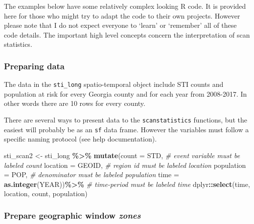 \documentclass[
]{book}
\newenvironment{Shaded}{\begin{snugshade}}{\end{snugshade}}
\newcommand{\AttributeTok}[1]{\textcolor[rgb]{0.13,0.29,0.53}{#1}}
\newcommand{\CommentTok}[1]{\textcolor[rgb]{0.56,0.35,0.01}{\textit{#1}}}
\newcommand{\FunctionTok}[1]{\textcolor[rgb]{0.13,0.29,0.53}{\textbf{#1}}}
\newcommand{\NormalTok}[1]{#1}
\newcommand{\OtherTok}[1]{\textcolor[rgb]{0.56,0.35,0.01}{#1}}
\newcommand{\SpecialCharTok}[1]{\textcolor[rgb]{0.81,0.36,0.00}{\textbf{#1}}}
\newenvironment{rmdcaution}[1]
  {
  \begin{itemize}
  \renewcommand{\labelitemi}{
    \raisebox{-.7\height}[0pt][0pt]{
      {\setkeys{Gin}{width=3em,keepaspectratio}\texttt{[image: images/\#1]}}
    }
  }
  \setlength{\fboxsep}{1em}
  \begin{caution}
  \item
  }
  {
  \end{caution}
  \end{itemize}
  }
\begin{document}
\begin{rmdcaution}{caution}
The examples below have some relatively complex looking R code. It is provided here for those who might try to adapt the code to their own projects. However please note that I do not expect everyone to `learn' or `remember' all of these code details. The important high level concepts concern the interpretation of scan statistics.

\end{rmdcaution}

\hypertarget{preparing-data}{%
\subsubsection{Preparing data}\label{preparing-data}}

The data in the \texttt{sti\_long} spatio-temporal object include STI counts and population at risk for every Georgia county and for each year from 2008-2017. In other words there are 10 rows for every county.

There are several ways to present data to the \texttt{scanstatistics} functions, but the easiest will probably be as an \texttt{sf} data frame. However the variables must follow a specific naming protocol (see help documentation).

\begin{Shaded}
\begin{Highlighting}[]
\NormalTok{sti\_scan2 }\OtherTok{\textless{}{-}}\NormalTok{ sti\_long }\SpecialCharTok{\%\textgreater{}\%}
  \FunctionTok{mutate}\NormalTok{(}\AttributeTok{count =}\NormalTok{ STD,       }\CommentTok{\# event variable must be labeled \textquotesingle{}count\textquotesingle{}}
         \AttributeTok{location =}\NormalTok{ GEOID, }\CommentTok{\# region id must be labeled \textquotesingle{}location\textquotesingle{}}
         \AttributeTok{population =}\NormalTok{ POP, }\CommentTok{\# denominator must be labeled \textquotesingle{}population}
         \AttributeTok{time =} \FunctionTok{as.integer}\NormalTok{(YEAR))}\SpecialCharTok{\%\textgreater{}\%}  \CommentTok{\# time{-}period must be labeled \textquotesingle{}time\textquotesingle{}}
\NormalTok{  dplyr}\SpecialCharTok{::}\FunctionTok{select}\NormalTok{(time, location, count, population) }
\end{Highlighting}
\end{Shaded}

\hypertarget{prepare-geographic-window-zones}{%
\subsubsection{\texorpdfstring{Prepare geographic window \emph{zones}}{Prepare geographic window zones}}\label{prepare-geographic-window-zones}}
\end{document}
